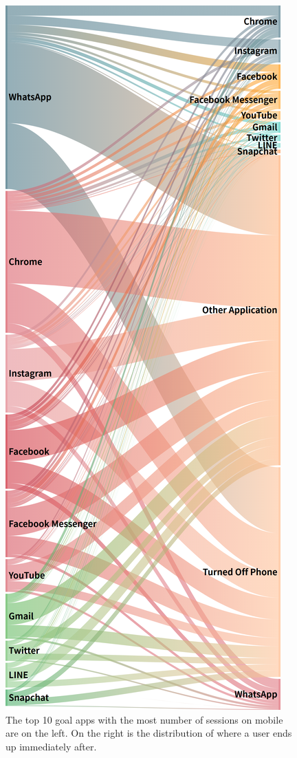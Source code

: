 \begin{figure}
\centering
\includegraphics[width=\textwidth,height=\textheight,keepaspectratio]{figures2/android_sankey_v7.png}
\caption{
The top 10 goal apps with the most number of sessions on mobile are on the left. On the right is the distribution of where a user ends up immediately after.
}
  \label{fig:android_sankey_v2} 
\end{figure}

